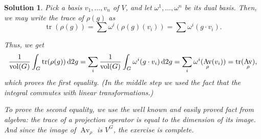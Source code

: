 \documentclass{article}
\theoremstyle{nonumberplain}
\newtheorem{sol}{Solution}
\DeclareMathOperator{\vol}{vol}
\DeclareMathOperator{\Av}{Av}
\DeclareMathOperator{\trace}{tr}
\begin{document}
\begin{sol}
Pick a basis $v_1, \dots, v_n$ of $V$, and let $\omega^1, \dots, \omega^n$ be its dual basis. Then, we may write the trace of $\rho(g)$ as
\begin{equation}
\trace(\rho(g)) = \sum \omega^i(\rho(g)(v_i)) = \sum \omega^i(g \cdot v_i).
\end{equation}

Thus, we get
\begin{equation}
\frac1{\vol(G)} \int_G \trace(\rho(g)) \dl2 g = 
\sum_i \frac1{\vol(G)} \int_G \omega^i(g \cdot v_i) \dl2 g =
\sum_i \omega^i(\Av_\rho(v_i)) = \trace(\Av_\rho),
\end{equation}
which proves the first equality. (In the middle step we used the fact that the integral commutes with linear transformations.)

To prove the second equality, we use the well known and easily proved fact from algebra: the trace of a projection operator is equal to the dimension of its image. And since the image of $\Av_\rho$ is $V^G$, the exercise is complete.
\end{sol}
\end{document}
